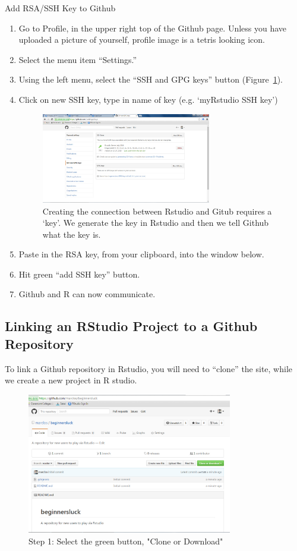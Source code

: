 \documentclass[12pt]{../SOP4_alpha}\usepackage[]{graphicx}\usepackage[]{color}
\begin{document}
\NP Add RSA/SSH Key to Github
  \begin{enumerate}
  \item Go to Profile, in the upper right top of the Github page. Unless you have uploaded a picture of yourself, profile image is a tetris looking icon.
  \item Select the menu item ``Settings.''
  \item Using the left menu, select the ``SSH and GPG keys'' button (Figure~\ref{fig:githubkey}).
  \item Click on new SSH key, type in name of key (e.g. `myRstudio SSH key')
  
\begin{figure}
\centering
\includegraphics[width=0.7\textwidth]{graphics/Github_SavedSSH.jpg}
\caption{Creating the connection between Rstudio and Gitub requires a `key'. We generate the key in Rstudio and then we tell Github what the key is.}
\label{fig:githubkey}
\end{figure}

  \item Paste in the RSA key, from your clipboard, into the window below.
  \item Hit green ``add SSH key'' button.
  \item Github and R can now communicate.
  \end{enumerate}


\subsection{Linking an RStudio Project to a Github Repository}

\NP To link a Github repository in Rstudio, you will need to ``clone'' the site, while we create a new project in R studio.


\begin{figure}[H]
\centering
\includegraphics[width=0.8\textwidth]{graphics/CloningGithub.jpg}
\caption{Step 1: Select the green button, "Clone or Download"}
\label{fig:step1}
\end{figure}
\end{document}
